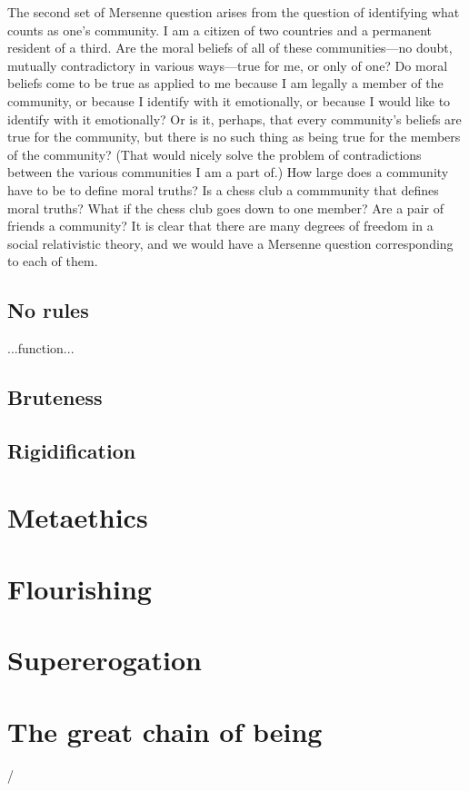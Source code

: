 The second set of Mersenne question arises from the question of identifying what counts as one's community. I am a citizen of two countries
and a permanent resident of a third. Are the moral beliefs of all of these communities---no doubt, mutually contradictory in various ways---true
for me, or only of one? Do moral beliefs come to be true as applied to me because I am legally a member of the community, or because I identify
with it emotionally, or because I would like to identify with it emotionally? Or is it, perhaps, that every community's beliefs are true
for the community, but there is no such thing as being true for the members of the community? (That would nicely solve the problem of
contradictions between the various communities I am a part of.) How large does a community have to be to define moral truths? Is a chess
club a commmunity that defines moral truths? What if the chess club goes down to one member? Are a pair of friends a community? It is clear
that there are many degrees of freedom in a social relativistic theory, and we would have a Mersenne question corresponding to each of them.

\subsection{No rules}
...function...
\subsection{Bruteness}
\subsection{Rigidification}

\section{Metaethics}
\section{Flourishing}
\section{Supererogation}
\section{The great chain of being}
\chaptertail 
/